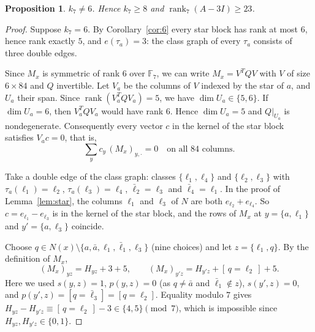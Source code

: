 \documentclass[11pt]{amsart}
\newtheorem{proposition}[theorem]{Proposition}
\theoremstyle{remark}
\newcommand{\F}{\mathbb{F}}
\DeclareMathOperator{\rk}{rank}
\begin{document}
\begin{proposition}\label{prop:8}
$k_7\ne6$. Hence $k_7\ge8$ and $\rk_7(A-3I)\ge23$.
\end{proposition}
\begin{proof}
Suppose $k_7=6$. By Corollary~\ref{cor:6} every star block has rank at most $6$, hence rank exactly $5$, and
$e(\tau_a)=3$: the class graph of every $\tau_a$ consists of three double edges.

Since $M_x$ is symmetric of rank $6$ over $\F_7$, we can write $M_x=V^{T}QV$ with $V$ of size $6\times84$ and $Q$
invertible. Let $V_a$ be the columns of $V$ indexed by the star of $a$, and $U_a$ their span. Since
$\rk(V_a^TQV_a)=5$, we have $\dim U_a\in\{5,6\}$. If $\dim U_a=6$, then $V_a^TQV_a$ would have rank $6$. Hence
$\dim U_a=5$ and $Q|_{U_a}$ is nondegenerate. Consequently every vector $c$ in the kernel of the star block satisfies
$V_ac=0$, that is,
\[
\sum_{y}c_y\,(M_x)_{y,\cdot}=0\quad\text{on all $84$ columns.}
\]

Take a double edge of the class graph: classes $\{\ell_1,\ell_4\}$ and $\{\ell_2,\ell_3\}$ with
$\tau_a(\ell_1)=\ell_2$, $\tau_a(\ell_3)=\ell_4$, $\bar\ell_2=\ell_3$ and $\bar\ell_4=\ell_1$. In the proof of
Lemma~\ref{lem:star}, the columns $\ell_1$ and $\ell_3$ of $N$ are both $e_{\ell_2}+e_{\ell_4}$. So
$c=e_{\ell_1}-e_{\ell_3}$ is in the kernel of the star block, and the rows of $M_x$ at $y=\{a,\ell_1\}$ and
$y'=\{a,\ell_3\}$ coincide.

Choose $q\in N(x)\setminus\{a,\bar a,\ell_1,\bar\ell_1,\ell_3\}$ (nine choices) and let $z=\{\ell_1,q\}$. By the definition
of $M_x$,
\[
(M_x)_{yz}=H_{yz}+3+5,\qquad (M_x)_{y'z}=H_{y'z}+[\,q=\ell_2\,]+5 .
\]
Here we used $s(y,z)=1$, $p(y,z)=0$ (as $q\ne\bar a$ and $\bar\ell_1\notin z$), $s(y',z)=0$, and
$p(y',z)=[q=\bar\ell_3]=[q=\ell_2]$. Equality modulo $7$ gives $H_{yz}-H_{y'z}\equiv[\,q=\ell_2\,]-3\in\{4,5\}\pmod 7$,
which is impossible since $H_{yz},H_{y'z}\in\{0,1\}$.
\end{proof}
\end{document}
